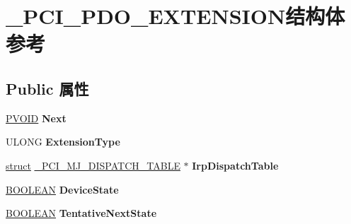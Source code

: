 \hypertarget{struct___p_c_i___p_d_o___e_x_t_e_n_s_i_o_n}{}\section{\+\_\+\+P\+C\+I\+\_\+\+P\+D\+O\+\_\+\+E\+X\+T\+E\+N\+S\+I\+O\+N结构体 参考}
\label{struct___p_c_i___p_d_o___e_x_t_e_n_s_i_o_n}
\subsection*{Public 属性}
\begin{DoxyCompactItemize}
\item 
\mbox{\label{struct___p_c_i___p_d_o___e_x_t_e_n_s_i_o_n_aa70ff8e7dde6ba9a879b6eb7b841a34c}} 
\hyperlink{interfacevoid}{P\+V\+O\+ID} {\bfseries Next}
\item 
\mbox{\label{struct___p_c_i___p_d_o___e_x_t_e_n_s_i_o_n_a968fa528cba025054c03a7174514509d}} 
U\+L\+O\+NG {\bfseries Extension\+Type}
\item 
\mbox{\label{struct___p_c_i___p_d_o___e_x_t_e_n_s_i_o_n_ac69719749ed4060203af85bf8115c6a0}} 
\hyperlink{interfacestruct}{struct} \hyperlink{struct___p_c_i___m_j___d_i_s_p_a_t_c_h___t_a_b_l_e}{\+\_\+\+P\+C\+I\+\_\+\+M\+J\+\_\+\+D\+I\+S\+P\+A\+T\+C\+H\+\_\+\+T\+A\+B\+LE} $\ast$ {\bfseries Irp\+Dispatch\+Table}
\item 
\mbox{\label{struct___p_c_i___p_d_o___e_x_t_e_n_s_i_o_n_a2014f1ed192e5e297307543c6e268f0f}} 
\hyperlink{_processor_bind_8h_a112e3146cb38b6ee95e64d85842e380a}{B\+O\+O\+L\+E\+AN} {\bfseries Device\+State}
\item 
\mbox{\label{struct___p_c_i___p_d_o___e_x_t_e_n_s_i_o_n_af13d85d5b7719c96cc92a5b2611f0f4c}} 
\hyperlink{_processor_bind_8h_a112e3146cb38b6ee95e64d85842e380a}{B\+O\+O\+L\+E\+AN} {\bfseries Tentative\+Next\+State}
\item 
\mbox{\label{struct___p_c_i___p_d_o___e_x_t_e_n_s_i_o_n_a5c2e4b33bf2e95be94c58a7f419539da}} 

\end{DoxyCompactItemize}
